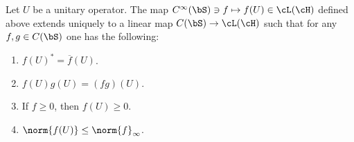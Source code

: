 \documentclass[oneside,reqno,letterpaper]{amsart}
\begin{document}
\begin{proposition}
\label{thm:unitary-FC}
  Let \(U\) be a unitary operator. 
  The map \(C^{\infty}(\bS) \ni f \mapsto f(U) \in \cL(\cH)\) defined above extends uniquely to a linear map \(C(\bS) \to \cL(\cH)\) such that for any \(f, g \in C(\bS)\) one has the following: 
  \begin{enumerate}[label=(\alph*)]
    \item\label{enum:unitary-FC:a}
      \(f(U)^* = \overline{f}(U)\). 
    \item\label{enum:unitary-FC:b}
      \(f(U)g(U) = (fg)(U)\). 
    \item\label{enum:unitary-FC:c}
      If  \(f \geq 0\), then \(f(U) \geq 0\). 
    \item\label{enum:unitary-FC:d}
      \(\norm{f(U)} \leq \norm{f}_{\infty}\). 
  \end{enumerate}
\end{proposition}
\end{document}
